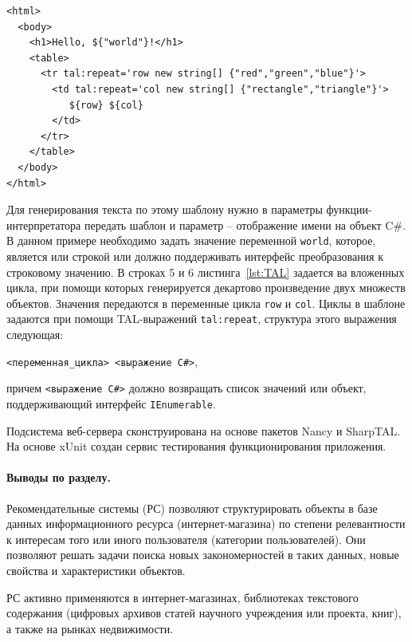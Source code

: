 \documentclass[a4paper,14pt,openany,final]{extreport} %
\def\oldcaption{} \let\oldcaption=\caption
\def\caption{\stepcounter{captionsnum}\oldcaption}
\begin{document}
\begin{pzlisting}
  \caption{Шаблон \textsc{SharpTAL} (пример)}\label{lst:TAL}
\begin{verbatim}
<html>
  <body>
    <h1>Hello, ${"world"}!</h1>
    <table>
      <tr tal:repeat='row new string[] {"red","green","blue"}'>
        <td tal:repeat='col new string[] {"rectangle","triangle"}'>
           ${row} ${col}
        </td>
      </tr>
    </table>
  </body>
</html>
\end{verbatim}
\end{pzlisting}

Для генерирования текста по этому шаблону нужно в параметры функции-интерпретатора передать шаблон и параметр -- отображение имени на объект C\#.  В данном примере необходимо задать значение переменной \verb|world|, которое, является или строкой или должно поддерживать интерфейс преобразования к строковому значению.  В строках 5 и 6 листинга~\ref{lst:TAL} задается ва вложенных цикла, при помощи которых генерируется декартово произведение двух множеств объектов. Значения передаются в переменные цикла \verb|row| и \verb|col|.  Циклы в шаблоне задаются при помощи TAL-выражений \verb|tal:repeat|, структура этого выражения следующая:
\begin{center}
\verb|<переменная_цикла> <выражение C#>|,
\end{center}
причем \verb|<выражение С#>| должно возвращать список значений или объект, поддерживающий интерфейс \verb|IEnumerable|.

Подсистема веб-сервера сконструирована на основе пакетов Nancy и SharpTAL. На основе xUnit создан сервис тестирования функционирования приложения.
\paragraph{Выводы по разделу.}

Рекомендательные системы (РС) позволяют структурировать объекты в базе данных информационного ресурса (интернет-магазина) по степени релевантности к интересам того или иного пользователя (категории пользователей). Они позволяют решать задачи поиска новых закономерностей в таких данных, новые свойства и характеристики объектов.

РС активно применяются в интернет-магазинах, библиотеках текстового содержания (цифровых архивов статей научного учреждения или проекта, книг), а также на рынках недвижимости.
\end{document}

